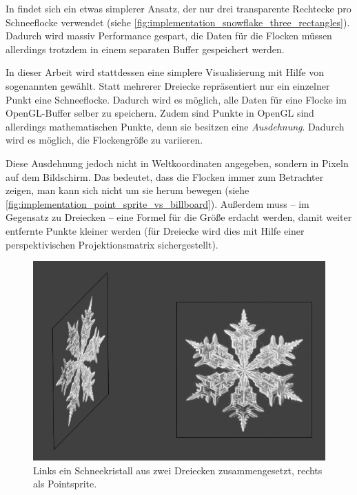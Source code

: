 In \cite{Saltvik2006} findet sich ein etwas simplerer Ansatz, der nur
drei transparente Rechtecke pro Schneeflocke verwendet (siehe
\autoref{fig:implementation_snowflake_three_rectangles}). Dadurch wird
massiv Performance gespart, die Daten für die Flocken müssen
allerdings trotzdem in einem separaten Buffer gespeichert werden.

In dieser Arbeit wird stattdessen eine simplere Visualisierung mit
Hilfe von sogenannten  gewählt. Statt
mehrerer Dreiecke repräsentiert nur ein einzelner Punkt eine
Schneeflocke. Dadurch wird es möglich, alle Daten für eine Flocke im
OpenGL-Buffer selber zu speichern. Zudem sind Punkte in OpenGL sind
allerdings mathematischen Punkte, denn sie besitzen eine
\emph{Ausdehnung}. Dadurch wird es möglich, die Flockengröße zu variieren.

Diese Ausdehnung jedoch nicht in Weltkoordinaten angegeben, sondern in
Pixeln auf dem Bildschirm. Das bedeutet, dass die Flocken immer zum
Betrachter zeigen, man kann sich nicht um sie herum bewegen (siehe
\autoref{fig:implementation_point_sprite_vs_billboard}). Außerdem muss
-- im Gegensatz zu Dreiecken -- eine Formel für die Größe erdacht
werden, damit weiter entfernte Punkte kleiner werden (für Dreiecke
wird dies mit Hilfe einer perspektivischen Projektionsmatrix
sichergestellt).

\begin{figure}[ht]
    \centering
    \includegraphics{images/point_sprite_vs_billboard}
    \caption{Links ein Schneekristall aus zwei Dreiecken zusammengesetzt, rechts als Pointsprite.}
    \label{fig:implementation_point_sprite_vs_billboard}
\end{figure}

